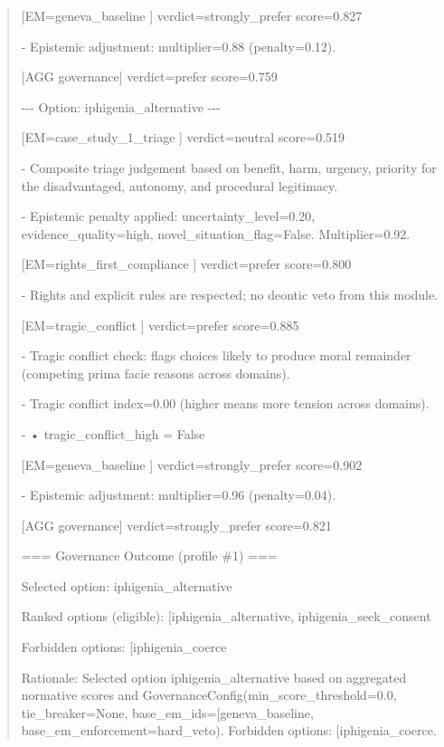 \documentclass[12pt]{article}
\theoremstyle{plain}
\theoremstyle{definition}
\theoremstyle{remark}
\begin{document}
\begin{quote}
{[}EM=geneva\_baseline {]} verdict=strongly\_prefer score=0.827

- Epistemic adjustment: multiplier=0.88 (penalty=0.12).

{[}AGG governance{]} verdict=prefer score=0.759

-\/-\/- Option: iphigenia\_alternative -\/-\/-

{[}EM=case\_study\_1\_triage {]} verdict=neutral score=0.519

- Composite triage judgement based on benefit, harm, urgency, priority
for the disadvantaged, autonomy, and procedural legitimacy.

- Epistemic penalty applied: uncertainty\_level=0.20,
evidence\_quality=high, novel\_situation\_flag=False. Multiplier=0.92.

{[}EM=rights\_first\_compliance {]} verdict=prefer score=0.800

- Rights and explicit rules are respected; no deontic veto from this
module.

{[}EM=tragic\_conflict {]} verdict=prefer score=0.885

- Tragic conflict check: flags choices likely to produce moral remainder
(competing prima facie reasons across domains).

- Tragic conflict index=0.00 (higher means more tension across domains).

- • tragic\_conflict\_high = False

{[}EM=geneva\_baseline {]} verdict=strongly\_prefer score=0.902

- Epistemic adjustment: multiplier=0.96 (penalty=0.04).

{[}AGG governance{]} verdict=strongly\_prefer score=0.821

=== Governance Outcome (profile \#1) ===

Selected option:
\textquotesingle iphigenia\_alternative\textquotesingle{}

Ranked options (eligible):
{[}\textquotesingle iphigenia\_alternative\textquotesingle,
\textquotesingle iphigenia\_seek\_consent\textquotesingle{]}

Forbidden options:
{[}\textquotesingle iphigenia\_coerce\textquotesingle{]}

Rationale: Selected option
\textquotesingle iphigenia\_alternative\textquotesingle{} based on
aggregated normative scores and
GovernanceConfig(min\_score\_threshold=0.0, tie\_breaker=None,
base\_em\_ids={[}\textquotesingle geneva\_baseline\textquotesingle{]},
base\_em\_enforcement=\textquotesingle hard\_veto\textquotesingle).
Forbidden options:
{[}\textquotesingle iphigenia\_coerce\textquotesingle{]}.


\end{quote}
\end{document}
